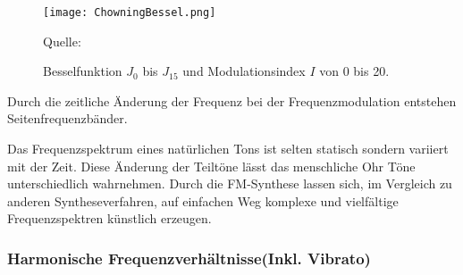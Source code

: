 \begin{figure} [ht]
\centering
  \texttt{[image: ChowningBessel.png]}
\caption{Besselfunktion $J_0$ bis $J_{15}$ und Modulationsindex $I$ von 0 bis 20. }
\label{fig:bessel3D}
Quelle: \cite{chowningPaper}
\end{figure}



Durch die zeitliche Änderung der Frequenz bei der Frequenzmodulation entstehen Seitenfrequenzbänder.


Das Frequenzspektrum eines natürlichen Tons ist selten statisch sondern variiert mit der Zeit. Diese Änderung der Teiltöne lässt das menschliche Ohr Töne unterschiedlich wahrnehmen. Durch die FM-Synthese lassen sich, im Vergleich zu anderen Syntheseverfahren, auf einfachen Weg komplexe und vielfältige Frequenzspektren künstlich erzeugen.

\FloatBarrier
\subsubsection{Harmonische Frequenzverhältnisse(Inkl. Vibrato)}


\FloatBarrier